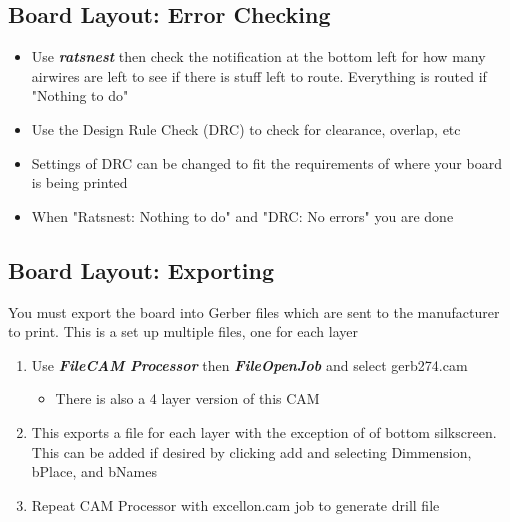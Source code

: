 \documentclass{article}
\begin{document}
\subsection{Board Layout: Error Checking}
\begin{itemize}
    \item Use \textit{\textbf{ratsnest}} then check the notification at the
    bottom left for how many airwires are left to see if there is stuff left to
    route. Everything is routed if "Nothing to do"
    \item Use the Design Rule Check (DRC) to check for clearance, overlap, etc
    \item Settings of DRC can be changed to fit the requirements of where your
    board is being printed
    \item When "Ratsnest: Nothing to do" and "DRC: No errors" you are done
\end{itemize}

\subsection{Board Layout: Exporting}
You must export the board into Gerber files which are sent to the manufacturer
to print. This is a set up multiple files, one for each layer
\begin{enumerate}
    \item Use \textit{\textbf{File\textrightarrow CAM Processor}} then
    \textit{\textbf{File\textrightarrow Open\textrightarrow Job}} and select
    gerb274.cam
    \begin{itemize}
        \item There is also a 4 layer version of this CAM
    \end{itemize}
    \item This exports a file for each layer with the exception of of bottom
    silkscreen. This can be added if desired by clicking add and selecting
    Dimmension, bPlace, and bNames
    \item Repeat CAM Processor with excellon.cam job to generate drill file
\end{enumerate}

\end{document}
